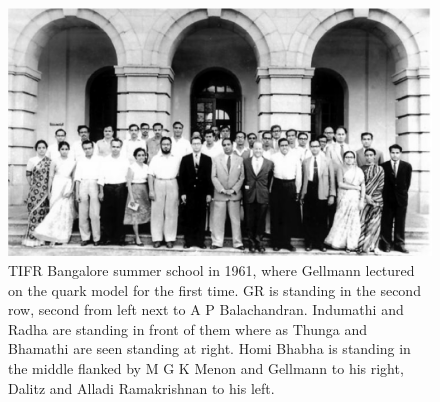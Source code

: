 \begin{figure}[H]
\centering
\includegraphics[scale=0.35]{src/images/chap25/6.eps}
\caption{TIFR Bangalore summer school in 1961, where Gellmann lectured on the
quark model for the first time. GR is standing in the second row, second from left
next to A P Balachandran. Indumathi and Radha are standing in front of them where
as Thunga and Bhamathi are seen standing at right. Homi Bhabha is standing in
the middle flanked by M G K Menon and Gellmann to his right, Dalitz and Alladi\break
Ramakrishnan to his left.}
\end{figure}
\smallskip

\drawline


